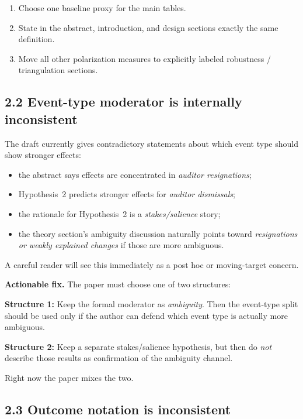 \documentclass[11pt]{article}
\begin{document}
\begin{enumerate}[leftmargin=1.5em]
    \item Choose one baseline proxy for the main tables.
    \item State in the abstract, introduction, and design sections exactly the same definition.
    \item Move all other polarization measures to explicitly labeled robustness / triangulation sections.
\end{enumerate}

\subsection*{2.2 Event-type moderator is internally inconsistent}

The draft currently gives contradictory statements about which event type should show stronger effects:

\begin{itemize}[leftmargin=1.5em]
    \item the abstract says effects are concentrated in \emph{auditor resignations};
    \item Hypothesis~2 predicts stronger effects for \emph{auditor dismissals};
    \item the rationale for Hypothesis~2 is a \emph{stakes/salience} story;
    \item the theory section's ambiguity discussion naturally points toward \emph{resignations or weakly explained changes} if those are more ambiguous.
\end{itemize}

A careful reader will see this immediately as a post hoc or moving-target concern.

\textbf{Actionable fix.} The paper must choose one of two structures:

\textbf{Structure 1:} Keep the formal moderator as \emph{ambiguity}. Then the event-type split should be used only if the author can defend which event type is actually more ambiguous.

\textbf{Structure 2:} Keep a separate stakes/salience hypothesis, but then do \emph{not} describe those results as confirmation of the ambiguity channel.

Right now the paper mixes the two.

\subsection*{2.3 Outcome notation is inconsistent}
\end{document}
